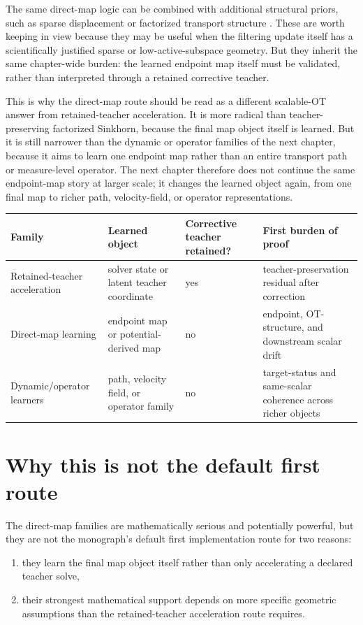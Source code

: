 The same direct-map logic can be combined with additional structural priors,
such as sparse displacement or factorized transport structure
\citep{forrow2019factored,chenxiezhang2024sicnn,xu2025flowot,geuter2025unot}.  These are worth
keeping in view because they may be useful when the filtering update itself has
a scientifically justified sparse or low-active-subspace geometry.  But they
inherit the same chapter-wide burden: the learned endpoint map itself must be
validated, rather than interpreted through a retained corrective teacher.

This is why the direct-map route should be read as a different scalable-OT
answer from retained-teacher acceleration.  It is more radical than
teacher-preserving factorized Sinkhorn, because the final map object itself is
learned.  But it is still narrower than the dynamic or operator families of the
next chapter, because it aims to learn one endpoint map rather than an entire
transport path or measure-level operator.  The next chapter therefore does not
continue the same endpoint-map story at larger scale; it changes the learned
object again, from one final map to richer path, velocity-field, or operator
representations.

\begin{center}
\small
\begin{tabular}{p{} p{} p{} p{}}
\toprule
Family & Learned object & Corrective teacher retained? & First burden of proof \\
\midrule
Retained-teacher acceleration & solver state or latent teacher coordinate & yes & teacher-preservation residual after correction \\
Direct-map learning & endpoint map or potential-derived map & no & endpoint, OT-structure, and downstream scalar drift \\
Dynamic/operator learners & path, velocity field, or operator family & no & target-status and same-scalar coherence across richer objects \\
\bottomrule
\end{tabular}
\end{center}

\section{Why this is not the default first route}
\label{sec:bf-neural-ot-direct-why-not-default}

The direct-map families are mathematically serious and potentially powerful, but
they are not the monograph’s default first implementation route for two reasons:
\begin{enumerate}[label=(\roman*)]
  \item they learn the final map object itself rather than only accelerating a
  declared teacher solve,
  \item their strongest mathematical support depends on more specific geometric
  assumptions than the retained-teacher acceleration route requires.
\end{enumerate}

